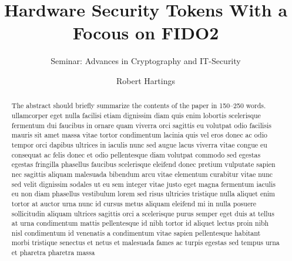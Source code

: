 \documentclass[runningheads]{llncs}
\begin{document}
%
\title{Hardware Security Tokens With a Focous on FIDO2}
\subtitle{Seminar: Advances in Cryptography and IT-Security}
%
%

\author{Robert Hartings}

%
\maketitle              %
%
\begin{abstract}
The abstract should briefly summarize the contents of the paper in
150--250 words. ullamcorper eget nulla facilisi etiam dignissim diam quis enim lobortis scelerisque fermentum dui faucibus in ornare quam viverra orci sagittis eu volutpat odio facilisis mauris sit amet massa vitae tortor condimentum lacinia quis vel eros donec ac odio tempor orci dapibus ultrices in iaculis nunc sed augue lacus viverra vitae congue eu consequat ac felis donec et odio pellentesque diam volutpat commodo sed egestas egestas fringilla phasellus faucibus scelerisque eleifend donec pretium vulputate sapien nec sagittis aliquam malesuada bibendum arcu vitae elementum curabitur vitae nunc sed velit dignissim sodales ut eu sem integer vitae justo eget magna fermentum iaculis eu non diam phasellus vestibulum lorem sed risus ultricies tristique nulla aliquet enim tortor at auctor urna nunc id cursus metus aliquam eleifend mi in nulla posuere sollicitudin aliquam ultrices sagittis orci a scelerisque purus semper eget duis at tellus at urna condimentum mattis pellentesque id nibh tortor id aliquet lectus proin nibh nisl condimentum id venenatis a condimentum vitae sapien pellentesque habitant morbi tristique senectus et netus et malesuada fames ac turpis egestas sed tempus urna et pharetra pharetra massa

\end{abstract}
%
%
%
\end{document}
